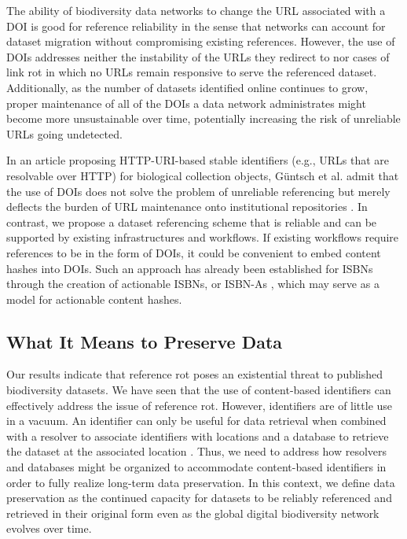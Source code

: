 The ability of biodiversity data networks to change the URL associated with a DOI is good for reference reliability in the sense that networks can account for dataset migration without compromising existing references. However, the use of DOIs addresses neither the instability of the URLs they redirect to nor cases of link rot in which no URLs remain responsive to serve the referenced dataset. Additionally, as the number of datasets identified online continues to grow, proper maintenance of all of the DOIs a data network administrates might become more unsustainable over time, potentially increasing the risk of unreliable URLs going undetected.

In an article proposing HTTP-URI-based stable identifiers (e.g., URLs that are resolvable over HTTP) for biological collection objects, Güntsch et al. admit that the use of DOIs does not solve the problem of unreliable referencing but merely deflects the burden of URL maintenance onto institutional repositories \citep{G_ntsch_2017}. In contrast, we propose a dataset referencing scheme that is reliable and can be supported by existing infrastructures and workflows. If existing workflows require references to be in the form of DOIs, it could be convenient to embed content hashes into DOIs. Such an approach has already been established for ISBNs through the creation of actionable ISBNs, or ISBN-As \citep{Weissberg_2008}, which may serve as a model for actionable content hashes.

\subsection*{What It Means to Preserve Data}
Our results indicate that reference rot poses an existential threat to published biodiversity datasets. We have seen that the use of content-based identifiers can effectively address the issue of reference rot. However, identifiers are of little use in a vacuum. An identifier can only be useful for data retrieval when combined with a resolver to associate identifiers with locations and a database to retrieve the dataset at the associated location \citep{Paskin_1999}. Thus, we need to address how resolvers and databases might be organized to accommodate content-based identifiers in order to fully realize long-term data preservation. In this context, we define data preservation as the continued capacity for datasets to be reliably referenced and retrieved in their original form even as the global digital biodiversity network evolves over time.

